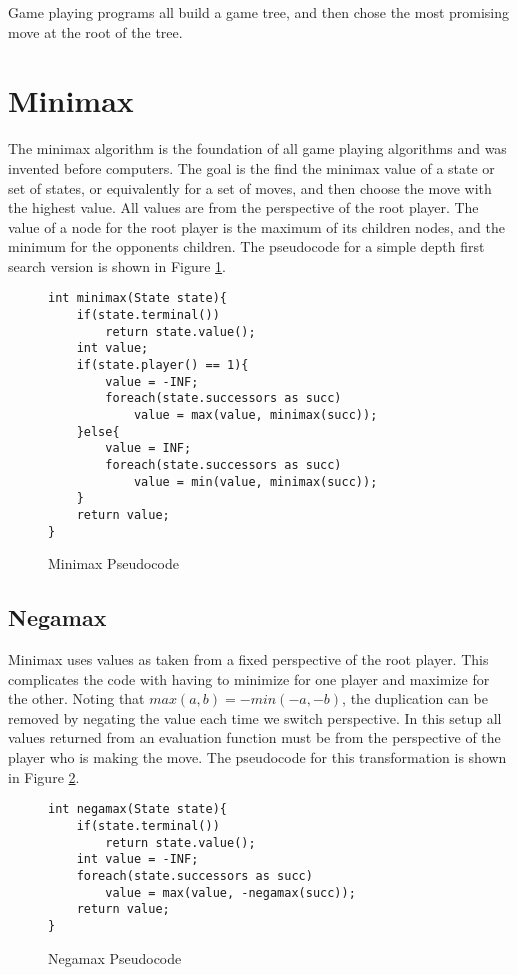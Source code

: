 

Game playing programs all build a game tree, and then chose the most promising move at the root of the tree.

\section{Minimax}

The minimax algorithm is the foundation of all game playing algorithms and was invented before computers. The goal is the find the minimax value of a state or set of states, or equivalently for a set of moves, and then choose the move with the highest value. All values are from the perspective of the root player. The value of a node for the root player is the maximum of its children nodes, and the minimum for the opponents children. The pseudocode for a simple depth first search version is shown in Figure \ref{fig:minimaxcode}.

\begin{figure}

\begin{lstlisting}
int minimax(State state){
	if(state.terminal())
		return state.value();
	int value;
	if(state.player() == 1){
		value = -INF;
		foreach(state.successors as succ)
			value = max(value, minimax(succ));
	}else{
		value = INF;
		foreach(state.successors as succ)
			value = min(value, minimax(succ));
	}
	return value;
}
\end{lstlisting}

\caption{Minimax Pseudocode}
\label{fig:minimaxcode}

\end{figure}


\subsection{Negamax}

Minimax uses values as taken from a fixed perspective of the root player. This complicates the code with having to minimize for one player and maximize for the other. Noting that $max(a,b) = -min(-a,-b)$, the duplication can be removed by negating the value each time we switch perspective. In this setup all values returned from an evaluation function must be from the perspective of the player who is making the move. The pseudocode for this transformation is shown in Figure \ref{fig:negamaxcode}.

\begin{figure}

\begin{lstlisting}
int negamax(State state){
	if(state.terminal())
		return state.value();
	int value = -INF;
	foreach(state.successors as succ)
		value = max(value, -negamax(succ));
	return value;
}
\end{lstlisting}

\caption{Negamax Pseudocode}
\label{fig:negamaxcode}
\end{figure}

